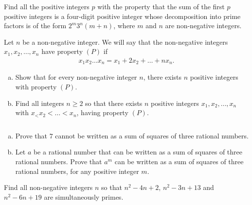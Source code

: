 \documentclass[problems.tex]{subfile}
\begin{document}
	
	\begin{problem}
		Find all the positive integers $p$ with the property that the sum of the first $p$ positive integers is a four-digit positive integer whose decomposition into prime factors is of the form $2^m3^n(m + n)$, where $m$ and $n$ are non-negative integers.
	\end{problem}
	
	
	
	\begin{problem}
		Let $n$ be a non-negative integer. We will say that the non-negative integers $x_1, x_2, \dots, x_n$ have property $(P)$ if
		\begin{align*}
			x_1x_2 \dots x_n = x_1 + 2x_2  + \dots + nx_n.
		\end{align*}
		\begin{enumerate}[(a)]
			\item  Show that for every non-negative integer $n$, there exists $n$ positive integers with property $(P)$.
			\item Find all integers $n \geq 2$ so that there exists $n$ positive integers $x_1, x_2, \dots, x_n$	with $x_< x_2< \dots< x_n$, having property $(P)$.
		\end{enumerate}
	\end{problem}
	
	
	\begin{problem}
		$ $
		\begin{enumerate}[(a)]
			\item Prove that $7$ cannot be written as a sum of squares of three rational numbers.
			\item Let $a$ be a rational number that can be written as a sum of squares of three rational numbers. Prove that $a^m$ can be written as a sum of squares of three rational numbers, for any positive integer $m$.
		\end{enumerate}
	\end{problem}
	
	
	
	
	\begin{problem}
		Find all non-negative integers $n$ so that $n^2 - 4n + 2$, $n^2 - 3n + 13$ and $n^2 - 6n + 19$ are simultaneously primes.
	\end{problem}
	
\end{document}
